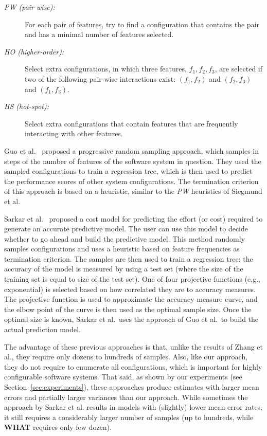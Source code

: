 \documentclass{newsig}
\newcommand{\what}{{\bf WHAT }}
\begin{document}
\begin{description}
\item[{\em PW (pair-wise):}] For each pair of features, try to find a configuration that contains the pair and has a minimal number of features selected. 
\item[{\em HO (higher-order):}] Select extra configurations, in which three features, $f_1,f_2,f_3$, are selected if two of the following pair-wise interactions exist: $(f_1,f_2)$ and $(f_2,f_3)$ and $(f_1,f_3)$.
\item[{\em HS (hot-spot):}] Select extra configurations that contain features that are
frequently interacting with other features. 
\end{description}


Guo et al.~\cite{guo2013variability} proposed a progressive random sampling approach, which samples in steps of the number of features of the software system in question. They used the sampled configurations to train a regression tree, which is then used to predict the performance scores of other system configurations. The termination criterion of this approach is based on a heuristic, similar to the {\em PW} heuristics of Siegmund et al. 

Sarkar et al.~\cite{sarkar2015cost} proposed a cost model for predicting the effort (or cost) required to generate an accurate predictive model. The user can use this model to decide whether to go ahead and build the predictive model. This method randomly samples configurations and uses a heuristic based on feature frequencies as termination criterion. The samples are then used to train a regression tree; the accuracy of the model is measured by using a test set (where the size of the training set is equal to size of the test set). One of four projective functions (e.g., exponential) is selected based on how correlated they are to  accuracy measures. The projective function is used to approximate the accuracy-measure curve, and the elbow point of the curve is then used as the optimal sample size. Once the optimal size is known, Sarkar et al.\ uses the approach of Guo et al.\ to build the actual prediction model.  


The advantage of these previous approaches is that, unlike  the results of Zhang et al., they require only dozens to hundreds of samples. Also, like our approach, they do not require to enumerate all configurations, which is important for highly configurable software systems. 
That said, as shown by our experiments (see Section~\ref{sec:experiments}), these approaches produce estimates with  larger mean errors and partially larger variances than our approach. While sometimes the approach by Sarkar et al. results in  models with (slightly)
lower mean error rates, it still requires a considerably larger number of samples (up to hundreds, while \what requires only few dozen).
 
\end{document}
